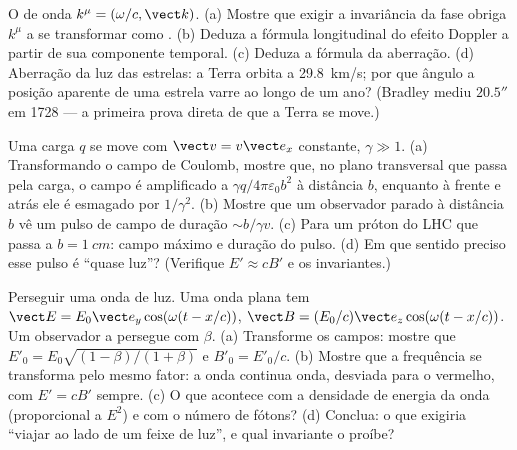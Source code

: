 \begin{exercise}[$\star\star$]\label{exo:b3:covariant-electromagnetism:8}
O  de onda $k^\mu = (\omega/c, \vect k)$. (a) Mostre que
exigir a invariância da fase obriga $k^\mu$ a se transformar como
. (b) Deduza a fórmula longitudinal do efeito Doppler a
partir de sua componente temporal. (c) Deduza a fórmula da aberração.
(d) Aberração da luz das estrelas: a Terra orbita a \qty{29.8}{km/s};
por que ângulo a posição aparente de uma estrela varre ao longo de um
ano? (Bradley mediu $20.5''$ em 1728 --- a primeira prova direta de que
a Terra se move.)
\end{exercise}

\begin{exercise}[$\star\star$]\label{exo:b3:covariant-electromagnetism:9}
Uma carga $q$ se move com $\vect v = v\vect e_x$ constante, $\gamma \gg
1$. (a) Transformando o campo de Coulomb, mostre que, no plano
transversal que passa pela carga, o campo é amplificado a $\gamma
q/4\pi\varepsilon_0b^2$ à distância $b$, enquanto à frente e atrás ele
é esmagado por $1/\gamma^2$. (b) Mostre que um observador parado à
distância $b$ vê um pulso de campo de duração
$\sim b/\gamma v$. (c) Para um próton do LHC que passa a $b = \qty{1}{cm}$:
campo máximo e duração do pulso. (d) Em que sentido preciso esse pulso
é ``quase luz''? (Verifique $E' \approx cB'$ e os invariantes.)
\end{exercise}

\begin{exercise}[$\star\star\star$]\label{exo:b3:covariant-electromagnetism:10}
Perseguir uma onda de luz. Uma onda plana tem $\vect E = E_0\vect e_y
\cos(\omega(t - x/c))$, $\vect B = (E_0/c)\vect e_z\cos(\omega(t -
x/c))$. Um observador a persegue com $\beta$. (a) Transforme os campos:
mostre que $E'_0 = E_0\sqrt{(1-\beta)/(1+\beta)}$ e $B'_0 = E'_0/c$. (b)
Mostre que a frequência se transforma pelo mesmo fator: a onda continua
onda, desviada para o vermelho, com $E' = cB'$ sempre. (c) O que
acontece com a densidade de energia da onda (proporcional a $E^2$) e
com o número de fótons? (d) Conclua: o que exigiria ``viajar ao lado de
um feixe de luz'', e qual invariante o proíbe?
\end{exercise}

